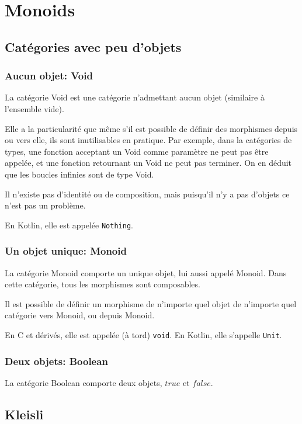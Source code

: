 \documentclass[a4paper,10pt,french,openany]{memoir}
\begin{document}
\chapter{Monoids}

\section{Catégories avec peu d'objets}

\subsection{Aucun objet: Void}
La catégorie Void est une catégorie n'admettant aucun objet (similaire à l'ensemble vide).

Elle a la particularité que même s'il est possible de définir des morphismes depuis ou vers elle, ils sont inutilisables en pratique. Par exemple, dans la catégories de types, une fonction acceptant un Void comme paramètre ne peut pas être appelée, et une fonction retournant un Void ne peut pas terminer. On en déduit que les boucles infinies sont de type Void.

Il n'existe pas d'identité ou de composition, mais puisqu'il n'y a pas d'objets ce n'est pas un problème.

En Kotlin, elle est appelée \lstinline{Nothing}.

\subsection{Un objet unique: Monoid}
La catégorie Monoid comporte un unique objet, lui aussi appelé Monoid.
Dans cette catégorie, tous les morphismes sont composables.

Il est possible de définir un morphisme de n'importe quel objet de n'importe quel catégorie vers Monoid, ou depuis Monoid.

En C et dérivés, elle est appelée (à tord) \lstinline{void}.
En Kotlin, elle s'appelle \lstinline{Unit}.

\subsection{Deux objets: Boolean}
La catégorie Boolean comporte deux objets, $true$ et $false$.

\section{Kleisli}

\printindex
\end{document}
